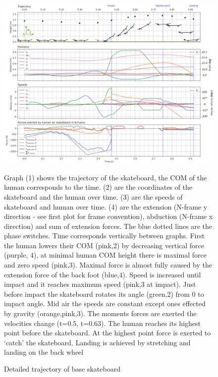 \documentclass[default,iicol]{sn-jnl}
\begin{document}
\begin{figure}
    \centering
    \includegraphics[trim={0cm 0cm 0cm 0cm},clip,width=\textwidth]{paper/figure/Results/data_basedpi600 (1).png}
    \caption[Trajectory, positions, speeds, and forces of base optimization]{\foot
    Detailed trajectory of base skateboard}\label{f_noparameter}
    Graph (1) shows the trajectory of the skateboard, the COM of the human corresponds to the time. (2) are the coordinates of the skateboard and the human over time. (3) are the speeds of skateboard and human over time. (4) are the extension (N-frame y direction - see first plot for frame convention), abduction (N-frame x direction) and sum of extension forces. The blue dotted lines are the phase switches. Time corresponds vertically between graphs. First the human lowers their COM (pink,2) by decreasing vertical force (purple, 4), at minimal human COM height there is maximal force and zero speed (pink,3). Maximal force is almost fully caused by the extension force of the back foot (blue,4). Speed is increased until impact and it reaches maximum speed (pink,3 at impact). Just before impact the skateboard rotates its angle (green,2) from 0 to impact angle. Mid air the speeds are constant except ones effected by gravity (orange,pink,3). The moments forces are exerted the velocities change (t=0.5, t=0.63). The human reaches its highest point before the skateboard. At the highest point force is exerted to `catch' the skateboard. Landing is achieved by stretching and landing on the back wheel
\end{figure}
\end{document}
